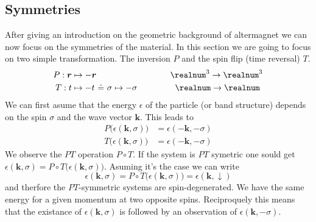 \documentclass[../main.tex]{main.tex}
\begin{document}
\subsection{Symmetries}
After giving an introduction on the geometric background of altermagnet we can now focus on the symmetries of the material. In this section
we are going to focus on two simple transformation. The inversion $P$ and the spin flip (time reversal) $T$.
\begin{alignat*}{2}
    P : \bm{r} &\mapsto -\bm{r} ~~~~~~~~~~~~~~~~~~~~ &~~~\realnum^3 \rightarrow \realnum^3 \\
    T : t &\mapsto -t  ~\hat{=} ~\sigma \mapsto -\sigma &\realnum \rightarrow \realnum~
\end{alignat*}
We can first asume that the energy $\epsilon$ of the particle (or band structure) depends on the spin $\sigma$ and the wave vector $\bm{k}$.
This leads to 
\begin{align*}
    P \bigl(\epsilon(\bm{k}, \sigma)\bigr) &= \epsilon(-\bm{k}, -\sigma)\\
    T \bigl(\epsilon(\bm{k}, \sigma)\bigr) &= \epsilon(-\bm{k}, -\sigma)
\end{align*}
We observe the $PT$ operation $P\circ T$. If the system is $PT$ symetric one sould get $\epsilon(\bm{k}, \sigma)= P\circ T\bigl(\epsilon(\bm{k}, \sigma)\bigr)$.
Asuming it's the case we can write
\[
    \epsilon(\bm{k}, \sigma)= P\circ T\bigl(\epsilon(\bm{k}, \sigma)\bigr) =  \epsilon(\bm{k}, \downarrow)
\] 
and therfore the $PT$-symmetric systems are spin-degenerated. We have the same energy for a given momentum at two opposite spins.
 Reciproquely this means that the existance 
of $ \epsilon(\bm{k}, \sigma)$ is followed by an observation of $ \epsilon(\bm{k}, -\sigma)$.\\
\end{document}
